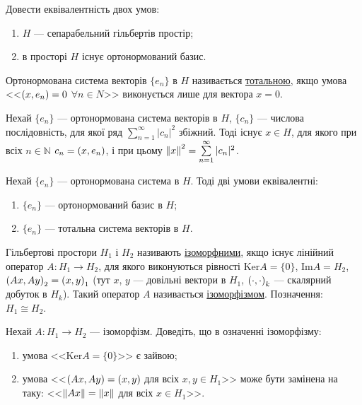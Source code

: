 \begin{exercise}
    Довести еквівалентність двох умов:
    \begin{enumerate}[label=\ukr*)]
        \item $H$ --- сепарабельний гільбертів простір;
        \item в просторі $H$ існує ортонормований базис.
    \end{enumerate}
\end{exercise}
\begin{theory}
    Ортонормована система векторів $\{e_n\}$ в $H$ називається \underline{тотальною}, 
    якщо умова <<$\left(x, e_n\right) = 0$ $\forall n \in N$>> виконується лише для вектора $x=0$.
\end{theory}
\begin{exercise}
    Нехай $\{e_n\}$ --- ортонормована система векторів в $H$, $\{c_n\}$ --- числова послідовність,
    для якої ряд $\sum\limits_{n=1}^\infty |c_n|^2$  збіжний. Тоді існує $x \in H$, 
    для якого при всіх $n \in \mathbb{N}$ $c_n = \left(x, e_n\right)$, і при цьому 
    $\left\lVert x\right\rVert^2 = \sum\limits_{n=1}^\infty |c_n|^2$.
\end{exercise}

\begin{exercise}
    Нехай $\{e_n\}$ --- ортонормована система в $H$. Тоді дві умови еквівалентні:
    \begin{enumerate}[label=\ukr*)]
        \item $\{e_n\}$ --- ортонормований базис в $H$;
        \item $\{e_n\}$ --- тотальна система векторів в $H$.
    \end{enumerate}
\end{exercise}

\begin{theory}
    Гільбертові простори $H_1$ і $H_2$ називають \underline{ізоморфними}, якщо існує 
    лінійний оператор $A: H_1 \rightarrow H_2$, для якого виконуються рівності
    $\mathrm{Ker} A = \{0\}$, $\mathrm{Im} A = H_2$, $\left(Ax, Ay\right)_2 = \left(x, y\right)_1$ (тут $x$, $y$ --- довільні 
    вектори в $H_1$, $\left(\cdot, \cdot\right)_k$ --- скалярний добуток в $H_k$). 
    Такий оператор $A$ називається \underline{ізоморфізмом}. Позначення: $H_1 \cong H_2 $.
\end{theory}

\begin{exercise}
    Нехай $A: H_1 \rightarrow H_2$ --- ізоморфізм. Доведіть, що в означенні ізоморфізму:
    \begin{enumerate}[label=\ukr*)]
        \item умова <<$\mathrm{Ker} A = \{0\}$>> є зайвою;
        \item умова <<$\left(Ax, Ay\right) = \left(x, y\right)$ для всіх $x, y \in H_1$>> може бути 
        замінена на таку: <<$\left\lVert Ax\right\rVert = \left\lVert x\right\rVert$ для всіх $x \in H_1$>>.
    \end{enumerate}
\end{exercise}